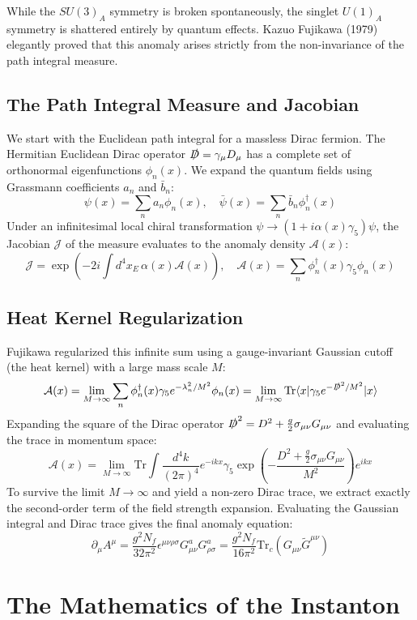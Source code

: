 \documentclass[12pt, a4paper]{article}
\begin{document}
While the $SU(3)_A$ symmetry is broken spontaneously, the singlet $U(1)_A$ symmetry is shattered entirely by quantum effects. Kazuo Fujikawa (1979) elegantly proved that this anomaly arises strictly from the non-invariance of the path integral measure.

\subsection{The Path Integral Measure and Jacobian}
We start with the Euclidean path integral for a massless Dirac fermion. The Hermitian Euclidean Dirac operator $\slashed{D} = \gamma_\mu D_\mu$ has a complete set of orthonormal eigenfunctions $\phi_n(x)$. We expand the quantum fields using Grassmann coefficients $a_n$ and $\bar{b}_n$:
\[
\psi(x) = \sum_n a_n \phi_n(x), \quad \bar{\psi}(x) = \sum_n \bar{b}_n \phi_n^\dagger(x)
\]
Under an infinitesimal local chiral transformation $\psi \rightarrow (1 + i\alpha(x)\gamma_5)\psi$, the Jacobian $\mathcal{J}$ of the measure evaluates to the anomaly density $\mathcal{A}(x)$:
\[
\mathcal{J} = \exp\left(-2i \int d^4x_E \, \alpha(x) \mathcal{A}(x)\right), \quad \mathcal{A}(x) = \sum_n \phi_n^\dagger(x) \gamma_5 \phi_n(x)
\]

\subsection{Heat Kernel Regularization}
Fujikawa regularized this infinite sum using a gauge-invariant Gaussian cutoff (the heat kernel) with a large mass scale $M$:
\[
\mathcal{A}(x) = \lim_{M \to \infty} \sum_n \phi_n^\dagger(x) \gamma_5 e^{-\lambda_n^2 / M^2} \phi_n(x) = \lim_{M \to \infty} \text{Tr} \langle x | \gamma_5 e^{-\slashed{D}^2/M^2} | x \rangle
\]
Expanding the square of the Dirac operator $\slashed{D}^2 = D^2 + \frac{g}{2}\sigma_{\mu\nu}G_{\mu\nu}$ and evaluating the trace in momentum space:
\[
\mathcal{A}(x) = \lim_{M \to \infty} \text{Tr} \int \frac{d^4k}{(2\pi)^4} e^{-ikx} \gamma_5 \exp\left( -\frac{D^2 + \frac{g}{2}\sigma_{\mu\nu}G_{\mu\nu}}{M^2} \right) e^{ikx}
\]
To survive the limit $M \to \infty$ and yield a non-zero Dirac trace, we extract exactly the second-order term of the field strength expansion. Evaluating the Gaussian integral and Dirac trace gives the final anomaly equation:
\[
\partial_\mu A^\mu = \frac{g^2 N_f}{32\pi^2} \epsilon^{\mu\nu\rho\sigma} G_{\mu\nu}^a G_{\rho\sigma}^a = \frac{g^2 N_f}{16\pi^2} \text{Tr}_c(G_{\mu\nu} \tilde{G}^{\mu\nu})
\]

\section{The Mathematics of the Instanton}
\end{document}
